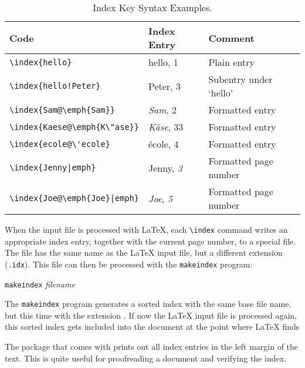 \begin{table}[!tp]
  \centering
  \caption{Index Key Syntax Examples.}\label{index}
  \begin{tabular}{@{}lll@{}}
    \toprule
    Code                                   & Index Entry           & Comment                \\
    \midrule
    \rule{0pt}{1.05em}\verb|\index{hello}| & hello, 1              & Plain entry            \\
    \verb|\index{hello!Peter}|             & \hspace*{2ex}Peter, 3 & Subentry under `hello' \\
    \verb|\index{Sam@\emph{Sam}}|          & \emph{Sam}, 2         & Formatted entry        \\
    \verb|\index{Kaese@\emph{K\"ase}}|     & \emph{K\"ase}, 33     & Formatted entry        \\
    \verb.\index{ecole@\'ecole}.           & \'ecole, 4            & Formatted entry        \\
    \verb.\index{Jenny|emph}.              & Jenny, \emph{3}       & Formatted page number  \\
    \verb.\index{Joe@\emph{Joe}|emph}.     & \emph{Joe}, \emph{5}  & Formatted page number  \\
    \bottomrule
  \end{tabular}
\end{table}

When the input file is processed with \LaTeX{}, each \verb|\index|
command writes an appropriate index entry, together with the current
page number, to a special file. The file has the same name as the
\LaTeX{} input file, but a different extension (\verb|.idx|). This
 file can then be processed with the \texttt{makeindex}
program:

\begin{lscommand}
  \texttt{makeindex} \emph{filename}
\end{lscommand}
The \texttt{makeindex} program generates a sorted index with the same base
file name, but this time with the extension . If now the
\LaTeX{} input file is processed again, this sorted index gets
included into the document at the point where \LaTeX{} finds
\begin{lscommand}
\end{lscommand}

The  package that comes with \LaTeXe{} prints out all
index entries in the left margin of the text. This is quite useful for
proofreading a document and verifying the index.

